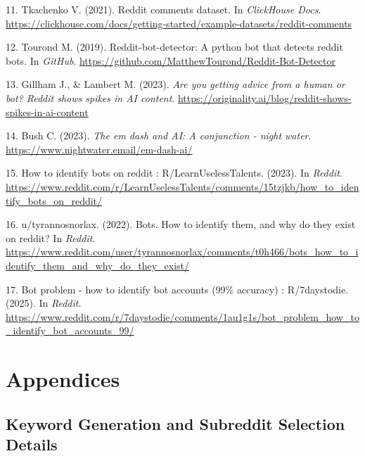 \documentclass[
  12pt,
  letterpaper,
  DIV=11,
  numbers=noendperiod]{scrartcl}
\newlength{\cslhangindent}
\newenvironment{CSLReferences}[2] %
 {\begin{list}{}{%
  \setlength{\itemindent}{0pt}
  \setlength{\leftmargin}{0pt}
  \setlength{\parsep}{0pt}
  \ifodd #1
   \setlength{\leftmargin}{\cslhangindent}
   \setlength{\itemindent}{-1\cslhangindent}
  \fi
  \setlength{\itemsep}{#2\baselineskip}}}
 {\end{list}}
\begin{document}
\begin{CSLReferences}{1}{0}
11. Tkachenko V. (2021). Reddit comments dataset. In \emph{ClickHouse
Docs}.
\url{https://clickhouse.com/docs/getting-started/example-datasets/reddit-comments}

12. Tourond M. (2019). Reddit-bot-detector: A python bot that detects
reddit bots. In \emph{GitHub}.
\url{https://github.com/MatthewTourond/Reddit-Bot-Detector}

13. Gillham J., \& Lambert M. (2023). \emph{Are you getting advice from
a human or bot? Reddit shows spikes in AI content}.
\url{https://originality.ai/blog/reddit-shows-spikes-in-ai-content}

14. Bush C. (2023). \emph{The em dash and AI: A conjunction - night
water}. \url{https://www.nightwater.email/em-dash-ai/}

15. How to identify bots on reddit : R/LearnUselessTalents. (2023). In
\emph{Reddit}.
\url{https://www.reddit.com/r/LearnUselessTalents/comments/15tzjkb/how_to_identify_bots_on_reddit/}

16. u/tyrannosnorlax. (2022). Bots. How to identify them, and why do
they exist on reddit? In \emph{Reddit}.
\url{https://www.reddit.com/user/tyrannosnorlax/comments/t0h466/bots_how_to_identify_them_and_why_do_they_exist/}

17. Bot problem - how to identify bot accounts (99\% accuracy) :
R/7daystodie. (2025). In \emph{Reddit}.
\url{https://www.reddit.com/r/7daystodie/comments/1au1g1s/bot_problem_how_to_identify_bot_accounts_99/}

\end{CSLReferences}

\newpage

\section*{Appendices}\label{appendices}

\subsection*{Keyword Generation and Subreddit Selection
Details}\label{keyword-generation-and-subreddit-selection-details}
\end{document}
